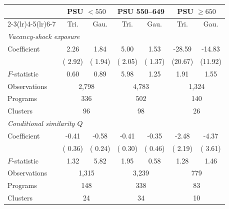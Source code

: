 \begin{tabular}{lcccccc}
\toprule
 & \multicolumn{2}{c}{PSU \(<550\)} & \multicolumn{2}{c}{PSU 550--649} & \multicolumn{2}{c}{PSU \(\geq650\)} \\
\cmidrule(lr){2-3}\cmidrule(lr){4-5}\cmidrule(lr){6-7}
 & Tri. & Gau. & Tri. & Gau. & Tri. & Gau. \\
\midrule
\multicolumn{7}{l}{\textit{Vacancy-shock exposure}} \\[2pt]
Coefficient &   2.26 &   1.84 &   5.00\sym{**} &   1.53 & -28.59 & -14.83 \\
 & ( 2.92) & ( 1.94) & ( 2.05) & ( 1.37) & (20.67) & (11.92) \\
\(F\)-statistic &  0.60 &  0.89 &  5.98 &  1.25 &  1.91 &  1.55 \\
Observations & \multicolumn{2}{c}{    2,798} & \multicolumn{2}{c}{    4,783} & \multicolumn{2}{c}{    1,324} \\
Programs & \multicolumn{2}{c}{      336} & \multicolumn{2}{c}{      502} & \multicolumn{2}{c}{      140} \\
Clusters & \multicolumn{2}{c}{       96} & \multicolumn{2}{c}{       98} & \multicolumn{2}{c}{       26} \\
\midrule
\multicolumn{7}{l}{\textit{Conditional similarity \(Q\)}} \\[2pt]
Coefficient &  -0.41 &  -0.58\sym{**} &  -0.41 &  -0.35 &  -2.48 &  -4.37 \\
 & ( 0.36) & ( 0.24) & ( 0.30) & ( 0.46) & ( 2.19) & ( 3.61) \\
\(F\)-statistic &  1.32 &  5.82 &  1.95 &  0.58 &  1.28 &  1.46 \\
Observations & \multicolumn{2}{c}{    1,315} & \multicolumn{2}{c}{    3,239} & \multicolumn{2}{c}{      779} \\
Programs & \multicolumn{2}{c}{      148} & \multicolumn{2}{c}{      338} & \multicolumn{2}{c}{       83} \\
Clusters & \multicolumn{2}{c}{       24} & \multicolumn{2}{c}{       34} & \multicolumn{2}{c}{       10} \\
\bottomrule
\end{tabular}
